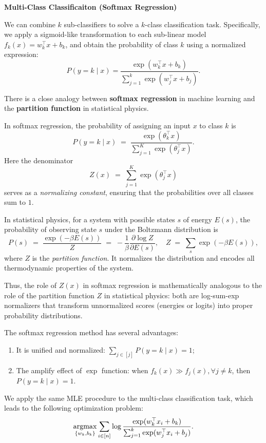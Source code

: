 \documentclass[../main]{subfiles}
\begin{document}
\begin{example}
  \textbf{Multi-Class Classificaiton (Softmax Regression)}
\end{example}
We can combine $k$ sub-classifiers to solve a $k$-class classification task. 
Specifically, we apply a sigmoid-like transformation to each sub-linear model 
$f_k(x) = w_k^\top x + b_k$, and obtain the probability of class $k$ using a normalized expression:
\begin{equation}
    P(y = k \mid x) 
    = \frac{\exp(w_k^\top x + b_k)}{\sum_{j=1}^{k} \exp(w_j^\top x + b_j)}.
\end{equation}
\begin{note}
  There is a close analogy between \textbf{softmax regression} in machine learning and the \textbf{partition function} in statistical physics.

  In softmax regression, the probability of assigning an input $x$ to class $k$ is
  \begin{equation}
    P(y=k \mid x) \;=\; \frac{\exp(\theta_k^\top x)}{\sum_{j=1}^K \exp(\theta_j^\top x)} .
  \end{equation}
  Here the denominator
  \begin{equation}
    Z(x) \;=\; \sum_{j=1}^K \exp(\theta_j^\top x)
  \end{equation}
  serves as a \emph{normalizing constant}, ensuring that the probabilities over all classes sum to $1$.

  In statistical physics, for a system with possible states $s$ of energy $E(s)$, the probability of observing state $s$ under the Boltzmann distribution is
  \begin{equation}
    P(s) \;=\; \frac{\exp(-\beta E(s))}{Z}\;=\;-\frac{1}{\beta}\frac{\partial \log Z}{\partial E(s)}, 
    \quad Z \;=\; \sum_{s} \exp(-\beta E(s)) ,
  \end{equation}
  where $Z$ is the \emph{partition function}. It normalizes the distribution and encodes all thermodynamic properties of the system.

  Thus, the role of $Z(x)$ in softmax regression is mathematically analogous to the role of the partition function $Z$ in statistical physics: both are log-sum-exp normalizers that transform unnormalized scores (energies or logits) into proper probability distributions.
\end{note}
\vspace{1em}
The softmax regression method has several advantages:
\begin{enumerate}
  \item It is unified and normalized: $\sum_{j\in[j]}P(y=k\mid x)=1$;
  \item The amplify effect of $\exp$ function: when $f_k(x)\gg f_j(x),\forall j\neq k$, then $P(y=k\mid x)=1$.
\end{enumerate}
We apply the same MLE procedure to the multi-class classification task, 
which leads to the following optimization problem:
\begin{equation}
    \mathop{\mathrm{argmax}}_{\{w_k,b_k\}} \sum_{i\in[n]} 
    \log \frac{\exp(w_k^\top x_i + b_k)}{\sum_{j=1}^{k} \exp(w_j^\top x_i + b_j)}.
\end{equation}
\end{document}
